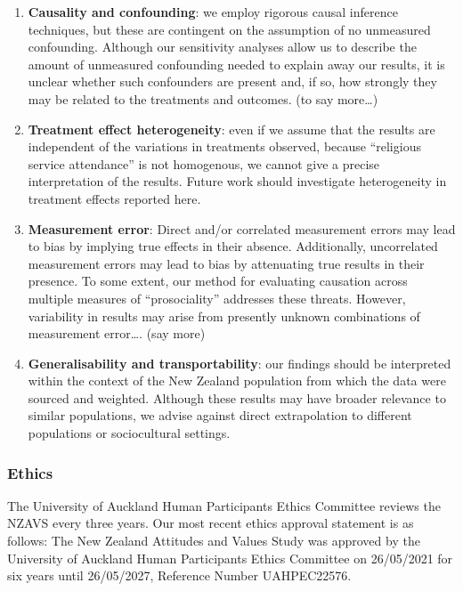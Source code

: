 \documentclass[
  single column]{article}
\begin{document}
\begin{enumerate}
\def\labelenumi{\arabic{enumi}.}
\item
  \textbf{Causality and confounding}: we employ rigorous causal
  inference techniques, but these are contingent on the assumption of no
  unmeasured confounding. Although our sensitivity analyses allow us to
  describe the amount of unmeasured confounding needed to explain away
  our results, it is unclear whether such confounders are present and,
  if so, how strongly they may be related to the treatments and
  outcomes. (to say more\ldots)
\item
  \textbf{Treatment effect heterogeneity}: even if we assume that the
  results are independent of the variations in treatments observed,
  because ``religious service attendance'' is not homogenous, we cannot
  give a precise interpretation of the results. Future work should
  investigate heterogeneity in treatment effects reported here.
\item
  \textbf{Measurement error}: Direct and/or correlated measurement
  errors may lead to bias by implying true effects in their absence.
  Additionally, uncorrelated measurement errors may lead to bias by
  attenuating true results in their presence. To some extent, our method
  for evaluating causation across multiple measures of ``prosociality''
  addresses these threats. However, variability in results may arise
  from presently unknown combinations of measurement error\ldots. (say
  more)
\item
  \textbf{Generalisability and transportability}: our findings should be
  interpreted within the context of the New Zealand population from
  which the data were sourced and weighted. Although these results may
  have broader relevance to similar populations, we advise against
  direct extrapolation to different populations or sociocultural
  settings.
\end{enumerate}

\newpage{}

\subsubsection{Ethics}\label{ethics}

The University of Auckland Human Participants Ethics Committee reviews
the NZAVS every three years. Our most recent ethics approval statement
is as follows: The New Zealand Attitudes and Values Study was approved
by the University of Auckland Human Participants Ethics Committee on
26/05/2021 for six years until 26/05/2027, Reference Number UAHPEC22576.
\end{document}
